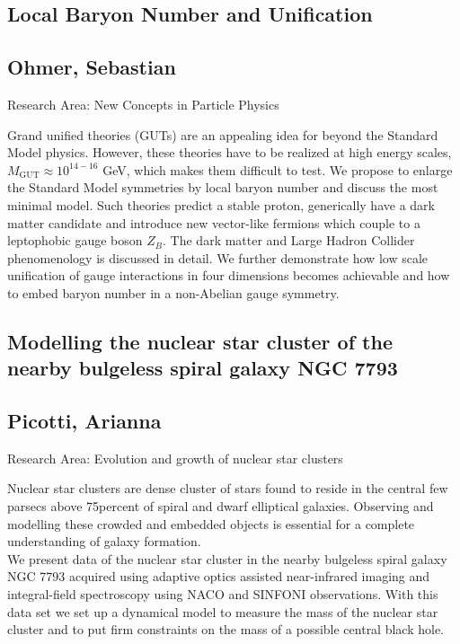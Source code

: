 \subsection*{\centering \large Local Baryon Number and Unification}
\subsection*{\centering \normalsize Ohmer, Sebastian}
Research Area: New Concepts in Particle Physics\newline

\noindent  Grand unified theories (GUTs) are an appealing idea for beyond the Standard Model physics. However, these theories have to be realized at high energy scales, $M_\text{GUT} \approx 10^{14-16}$ GeV, which makes them difficult to test. We propose to enlarge the Standard Model symmetries by local baryon number and discuss the most minimal model. Such theories predict a stable proton, generically have a dark matter candidate and introduce new vector-like fermions which couple to a leptophobic gauge boson $Z_B$. The dark matter and Large Hadron Collider phenomenology is discussed in detail. We further demonstrate how low scale unification of gauge interactions in four dimensions becomes achievable and how to embed baryon number in a non-Abelian gauge symmetry. 
\newpage
\subsection*{\centering \large Modelling the nuclear star cluster of the nearby bulgeless spiral galaxy NGC 7793}
\subsection*{\centering \normalsize Picotti, Arianna}
Research Area: Evolution and growth of nuclear star clusters\newline

\noindent Nuclear star clusters are dense cluster of stars found to reside in the central few parsecs above 75percent of spiral and dwarf elliptical galaxies. Observing and modelling these crowded and embedded objects is essential for a complete understanding of galaxy formation.\\We present data of the nuclear star cluster in the nearby bulgeless spiral galaxy NGC 7793 acquired using adaptive optics assisted near-infrared imaging and integral-field spectroscopy using NACO and SINFONI observations. With this data set we set up a dynamical model to measure the mass of the nuclear star cluster and to put firm constraints on the mass of a possible central black hole.


